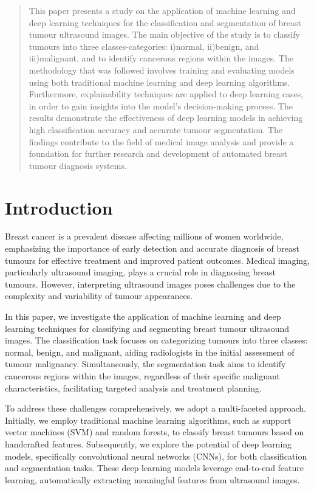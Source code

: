 \begin{abstract}
This paper presents a study on the application of machine learning and deep learning techniques for the classification and segmentation of breast tumour ultrasound images. The main objective of the study is to classify tumours into three classes-categories: i)normal, ii)benign, and iii)malignant, and to identify cancerous regions within the images. The methodology that was followed involves training and evaluating models using both traditional machine learning and deep learning algorithms. Furthermore, explainability techniques are applied to deep learning cases, in order to gain insights into the model's decision-making process. The results demonstrate the effectiveness of deep learning models in achieving high classification accuracy and accurate tumour segmentation. The findings contribute to the field of medical image analysis and provide a foundation for further research and development of automated breast tumour diagnosis systems.
\end{abstract}

\section{Introduction}
Breast cancer is a prevalent disease affecting millions of women worldwide, emphasizing the importance of early detection and accurate diagnosis of breast tumours for effective treatment and improved patient outcomes. Medical imaging, particularly ultrasound imaging, plays a crucial role in diagnosing breast tumours. However, interpreting ultrasound images poses challenges due to the complexity and variability of tumour appearances.

In this paper, we investigate the application of machine learning and deep learning techniques for classifying and segmenting breast tumour ultrasound images. The classification task focuses on categorizing tumours into three classes: normal, benign, and malignant, aiding radiologists in the initial assessment of tumour malignancy. Simultaneously, the segmentation task aims to identify cancerous regions within the images, regardless of their specific malignant characteristics, facilitating targeted analysis and treatment planning.

To address these challenges comprehensively, we adopt a multi-faceted approach. Initially, we employ traditional machine learning algorithms, such as support vector machines (SVM) and random forests, to classify breast tumours based on handcrafted features. Subsequently, we explore the potential of deep learning models, specifically convolutional neural networks (CNNs), for both classification and segmentation tasks. These deep learning models leverage end-to-end feature learning, automatically extracting meaningful features from ultrasound images.

